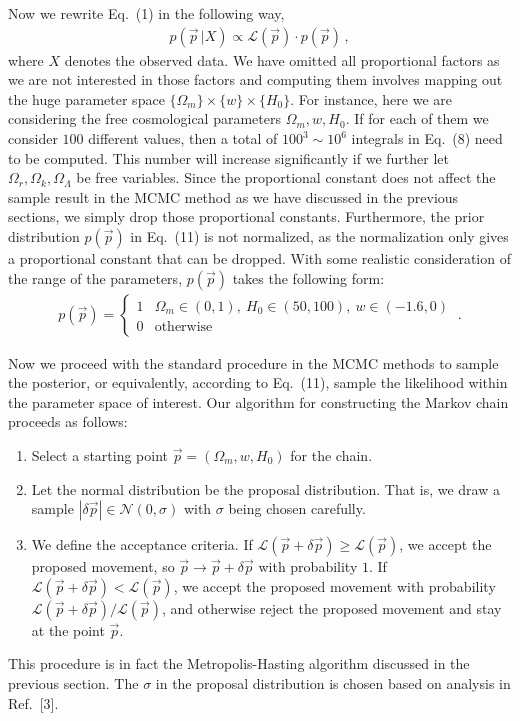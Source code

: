 \documentclass[11pt]{article}
\theoremstyle{break}
\theoremstyle{break}
\begin{document}
${}$\qquad Now we rewrite Eq.\ (1) in the following way,
\begin{align}
p(\vec{p}\,|X) \propto \mathcal{L}(\vec{p})\cdot p(\vec{p})\,,
\end{align}
where $X$ denotes the observed data. We have omitted all proportional factors as we are not interested in those factors and computing them involves mapping out the huge parameter space $\{\Omega_m\} \times \{w\} \times \{H_0\}$. For instance, here we are considering the free cosmological parameters $\Omega_m,w, H_0$. If for each of them we consider $100$ different values, then a total of $100^3 \sim 10^{6}$ integrals in Eq.\ (8) need to be computed. This number will increase significantly if we further let $\Omega_r, \Omega_k, \Omega_\Lambda$ be free variables. Since the proportional constant does not affect the sample result in the MCMC method as we have discussed in the previous sections, we simply drop those proportional constants. Furthermore, the prior distribution $p(\vec{p})$ in Eq.\ (11) is not normalized, as the normalization only gives a proportional constant that can be dropped. With some realistic consideration of the range of the parameters, $p(\vec{p})$ takes the following form:
\begin{align*}
p(\vec{p}) = \begin{cases}
1 & \Omega_m\in (0,1), \ H_0\in (50,100),\ w\in (-1.6, 0) \\
0 & \text{otherwise}
\end{cases}\ .
\end{align*}

${}$\qquad Now we proceed with the standard procedure in the MCMC methods to sample the posterior, or equivalently, according to Eq.\ (11), sample the likelihood within the parameter space of interest. Our algorithm for constructing the Markov chain proceeds as follows:
\begin{enumerate}
\item Select a starting point $\vec{p} = (\Omega_m, w, H_0)$ for the chain.
\item Let the normal distribution be the proposal distribution. That is, we draw a sample $|\delta \vec{p}| \in \mathcal{N}(0,\sigma)$ with $\sigma$ being chosen carefully.
\item We define the acceptance criteria. If $\mathcal{L}(\vec{p}+\delta \vec{p}) \geq \mathcal{L}(\vec{p})$, we accept the proposed movement, so $\vec{p} \to \vec{p} + \delta \vec{p}$ with probability $1$. If $\mathcal{L}(\vec{p} + \delta \vec{p}) < \mathcal{L}(\vec{p})$, we accept the proposed movement with probability $\mathcal{L}(\vec{p}+\delta\vec{p})/\mathcal{L}(\vec{p})$, and otherwise reject the proposed movement and stay at the point $\vec{p}$.
\end{enumerate} 
This procedure is in fact the Metropolis-Hasting algorithm discussed in the previous section. The $\sigma$ in the proposal distribution is chosen based on analysis in {Ref.\ [3]}. \\
\end{document}
